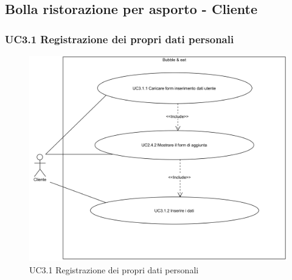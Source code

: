 \subsection{Bolla ristorazione per asporto - Cliente}

\subsubsection{UC3.1 Registrazione dei propri dati personali} \label{UC3.1}

\begin{figure}[H]
	\centering
	\includegraphics[width=15cm]{../../documenti/AnalisiDeiRequisiti/Diagrammi_img/uc3_1.png}
	\caption{UC3.1 Registrazione dei propri dati personali}
\end{figure}

